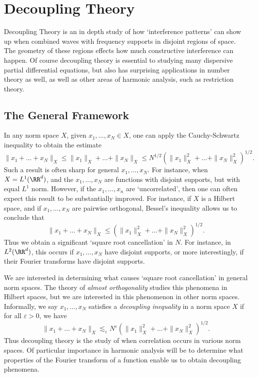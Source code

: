
\part{Decoupling Theory}

Decoupling Theory is an in depth study of how `interference patterns' can show up when combined waves with frequency supports in disjoint regions of space. The geometry of these regions effects how much constructive interference can happen. Of course decoupling theory is essential to studying many dispersive partial differential equations, but also has surprising applications in number theory as well, as well as other areas of harmonic analysis, such as restriction theory.

\chapter{The General Framework}

In any norm space $X$, given $x_1, \dots, x_N \in X$, one can apply the Cauchy-Schwartz inequality to obtain the estimate
%
\[ \| x_1 + \dots + x_N \|_X \leq \| x_1 \|_X + \dots + \| x_N \|_X \leq N^{1/2} \left( \| x_1 \|_X^2 + \dots + \| x_N \|_X^2 \right)^{1/2}. \]
%
Such a result is often sharp for general $x_1, \dots, x_N$. For instance, when $X = L^1(\RR^d)$, and the $x_1, \dots, x_N$ are functions with disjoint supports, but with equal $L^1$ norm. However, if the $x_1, \dots, x_n$ are `uncorrelated', then one can often expect this result to be substantially improved. For instance, if $X$ is a Hilbert space, and if $x_1, \dots, x_N$ are pairwise orthogonal, Bessel's inequality allows us to conclude that
%
\[ \| x_1 + \dots + x_N \|_X \leq \left( \| x_1 \|_X^2 + \dots + \| x_N \|_X^2 \right)^{1/2}. \]
%
Thus we obtain a significant `square root cancellation' in $N$. For instance, in $L^2(\RR^d)$, this occurs if $x_1, \dots, x_N$ have disjoint supports, or more interestingly, if their Fourier transforms have disjoint supports.

We are interested in determining what causes `square root cancellation' in general norm spaces. The theory of \emph{almost orthogonality} studies this phenomena in Hilbert spaces, but we are interested in this phenomenon in other norm spaces. Informally, we say $x_1, \dots, x_N$ satisfies a \emph{decoupling inequality} in a norm space $X$ if for all $\varepsilon > 0$, we have
%
\[ \| x_1 + \dots + x_N \|_X \lesssim_\varepsilon N^\varepsilon \left( \| x_1 \|_X^2 + \dots + \| x_N \|_X^2 \right)^{1/2}. \]
%
Thus decoupling theory is the study of when correlation occurs in various norm spaces. Of particular importance in harmonic analysis will be to determine what properties of the Fourier transform of a function enable us to obtain decoupling phenomena.


